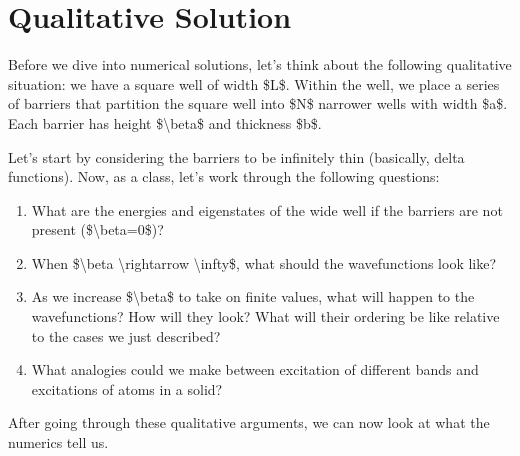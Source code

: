\documentclass[letterpaper,10pt,english]{jupyterBook}
\begin{document}
\section{Qualitative Solution}
\label{\detokenize{Section6_v2:qualitative-solution}}
\sphinxAtStartPar
Before we dive into numerical solutions, let’s think about the following qualitative situation: we have a square well of width \$L\$. Within the well, we place a series of barriers that partition the square well into \$N\$ narrower wells with width \$a\$. Each barrier has height \$\textbackslash{}beta\$ and thickness \$b\$.

\sphinxAtStartPar
Let’s start by considering the barriers to be infinitely thin (basically, delta functions). Now, as a class, let’s work through the following questions:
\begin{enumerate}
%
\item {} 
\sphinxAtStartPar
What are the energies and eigenstates of the wide well if the barriers are not present (\$\textbackslash{}beta=0\$)?

\item {} 
\sphinxAtStartPar
When \$\textbackslash{}beta \textbackslash{}rightarrow \textbackslash{}infty\$, what should the wavefunctions look like?

\item {} 
\sphinxAtStartPar
As we increase \$\textbackslash{}beta\$ to take on finite values, what will happen to the wavefunctions? How will they look? What will their ordering be like relative to the cases we just described?

\item {} 
\sphinxAtStartPar
What analogies could we make between excitation of different bands and excitations of atoms in a solid?

\end{enumerate}

\sphinxAtStartPar
After going through these qualitative arguments, we can now look at what the numerics tell us.
\end{document}
